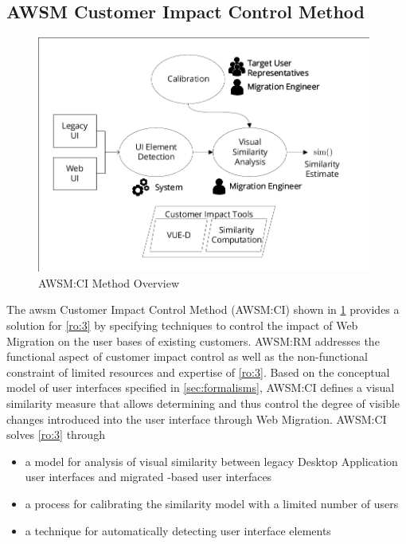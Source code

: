 \vspace{-10pt}
\hypertarget{awsm-customer-impact-control-method}{%
\subsection{AWSM Customer Impact Control Method}\label{awsm-customer-impact-control-method}}
\vspace{10pt}

\begin{figure}[h!]
\hypertarget{fig:solution-ci}{%
\centering
\includegraphics[width=0.98\textwidth]{../figures/solution-ci.pdf}
\caption{AWSM:CI Method Overview}\label{fig:solution-ci}
}
\end{figure}

The \gls{awsm} Customer Impact Control Method (AWSM:CI) shown in \cref{fig:solution-ci} provides a solution for \cref{ro:3} by specifying techniques to control the impact of \gls{Web Migration} on the user bases of existing customers. %
AWSM:RM addresses the functional aspect of customer impact control as well as the non-functional constraint of limited resources and expertise of \cref{ro:3}.
Based on the conceptual model of  user interfaces specified in \cref{sec:formalisms}, AWSM:CI defines a visual similarity measure that allows determining and thus control the degree of visible changes introduced into the user interface through \gls{Web Migration}.
AWSM:CI solves \cref{ro:3} through
\begin{itemize}
\item a model for analysis of visual similarity between legacy \gls{Desktop Application} user interfaces and migrated -based user interfaces
\item a process for calibrating the similarity model with a limited number of users
\item a technique for automatically detecting user interface elements
\end{itemize}


